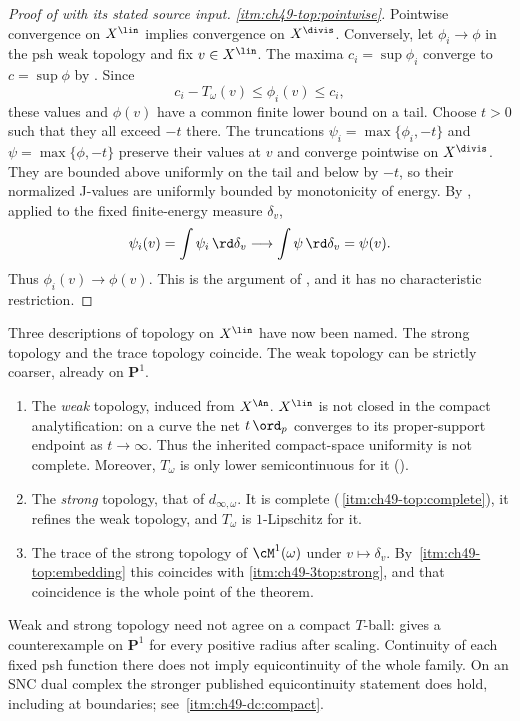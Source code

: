 \begin{proof}[Proof of  with its stated source input]
\emph{\cref{itm:ch49-top:pointwise}.}
Pointwise convergence on $X^{\lin}$ implies convergence on $X^{\divis}$.
Conversely, let $\phi_i\to\phi$ in the psh weak topology and fix
$v\in X^{\lin}$.  The maxima $c_i=\sup\phi_i$ converge to
$c=\sup\phi$ by .  Since
\[
 c_i-T_\omega(v)\le\phi_i(v)\le c_i,
\]
these values and $\phi(v)$ have a common finite lower bound on a tail.
Choose $t>0$ such that they all exceed $-t$ there.
The truncations $\psi_i=\max\{\phi_i,-t\}$ and
$\psi=\max\{\phi,-t\}$ preserve their values at $v$ and converge
pointwise on $X^{\divis}$.  They are bounded above uniformly on the
tail and below by $-t$, so their normalized J-values are uniformly
bounded by monotonicity of energy.  By
\cite[Proposition~9.19]{BJ22}, applied to the fixed finite-energy
measure $\delta_v$,
\[
 \psi_i(v)=\int\psi_i\,\rd\delta_v\longrightarrow
 \int\psi\,\rd\delta_v=\psi(v).
\]
Thus $\phi_i(v)\to\phi(v)$.  This is the argument of
\cite[Theorem~11.4]{BJ22}, and it has no characteristic restriction.
\end{proof}

\begin{remark}
\label{rem:ch49-three-topologies}
Three descriptions of topology on $X^{\lin}$ have now been named.  The
strong topology and the trace topology coincide.  The weak topology
can be strictly coarser, already on $\mathbf P^1$.
\begin{enumerate}
\item\label{itm:ch49-3top:weak}
      The \emph{weak} topology, induced from $X^{\An}$.  $X^{\lin}$ is not closed in the compact analytification:
      on a curve the net $t\,\ord_p$ converges to its proper-support
      endpoint as $t\to\infty$.  Thus the inherited compact-space
      uniformity is not complete.  Moreover,
      $T_\omega$ is only lower semicontinuous for it
      ().
\item\label{itm:ch49-3top:strong}
      The \emph{strong} topology, that of $d_{\infty,\omega}$.  It is
      complete (\,\cref{itm:ch49-top:complete}),
      it refines the weak topology, and $T_\omega$ is
      $1$-Lipschitz for it.
\item\label{itm:ch49-3top:trace}
      The trace of the strong topology of $\cM^1(\omega)$ under
      $v\mapsto\delta_v$.  By
      \,\cref{itm:ch49-top:embedding}
      this coincides with \cref{itm:ch49-3top:strong}, and that coincidence
      is the whole point of the theorem.
\end{enumerate}
Weak and strong topology need not agree on a compact $T$-ball:
 gives a counterexample on $\mathbf P^1$
for every positive radius after scaling.  Continuity of each fixed psh
function there does not imply equicontinuity of the whole family.
On an SNC dual complex the stronger published equicontinuity statement
does hold, including at boundaries; see
\,\cref{itm:ch49-dc:compact}.
\end{remark}

